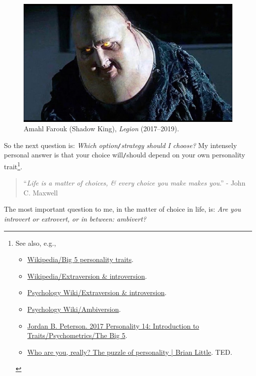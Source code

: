 \documentclass[12pt]{article}
\begin{document}
\begin{figure}[H]
	\centering
	\includegraphics[width = 15cm]{Shadow_King}
	\caption{Amahl Farouk (Shadow King), {\it Legion} (2017--2019).}
	\label{fig3}
\end{figure}
So the next question is: {\it Which option{\tt/}strategy should I choose?} My intensely personal answer is that your choice will{\tt/}should depend on your own personality trait\footnote{See also, e.g.,
	\begin{itemize}
		\item \href{https://en.wikipedia.org/wiki/Big_Five_personality_traits}{Wikipedia/Big 5 personality traits}.
		\item \href{https://en.wikipedia.org/wiki/Extraversion_and_introversion}{Wikipedia/Extraversion \& introversion}.
		\item \href{https://psychology.wikia.org/wiki/Extraversion_and_introversion}{Psychology Wiki/Extraversion \& introversion}.
		\item \href{https://psychology.wikia.org/wiki/Ambiversion}{Psychology Wiki/Ambiversion}.
		\item \href{https://www.youtube.com/watch?v=pCceO_D4AlY}{Jordan B. Peterson. 2017 Personality 14: Introduction to Traits/Psychometrics/The Big 5}.
		\item \href{https://www.youtube.com/watch?v=qYvXk_bqlBk}{Who are you, really? The puzzle of personality | Brian Little}. TED.
\end{itemize}}.
\begin{quotation}
	``{\it Life is a matter of choices, \& every choice you make makes you}.'' - John C. Maxwell
\end{quotation}
The most important question to me, in the matter of choice in life, is: {\it Are you introvert or extrovert, or in between: ambivert?}
\end{document}
